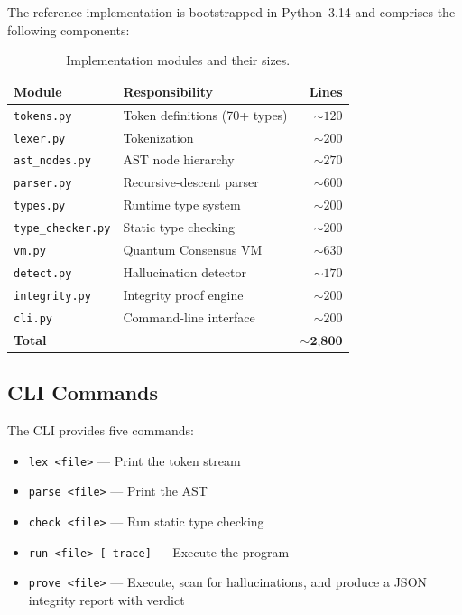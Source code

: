 \documentclass[11pt,a4paper]{article}
\begin{document}
The reference implementation is bootstrapped in Python~3.14 and comprises
the following components:

\begin{table}[H]
\centering
\caption{Implementation modules and their sizes.}
\label{tab:modules}
\begin{tabular}{@{}llr@{}}
\toprule
\textbf{Module} & \textbf{Responsibility} & \textbf{Lines} \\
\midrule
\texttt{tokens.py}       & Token definitions (70+ types)           & ${\sim}120$ \\
\texttt{lexer.py}        & Tokenization                            & ${\sim}200$ \\
\texttt{ast\_nodes.py}   & AST node hierarchy                      & ${\sim}270$ \\
\texttt{parser.py}       & Recursive-descent parser                & ${\sim}600$ \\
\texttt{types.py}        & Runtime type system                     & ${\sim}200$ \\
\texttt{type\_checker.py}& Static type checking                    & ${\sim}200$ \\
\texttt{vm.py}           & Quantum Consensus VM                    & ${\sim}630$ \\
\texttt{detect.py}       & Hallucination detector                  & ${\sim}170$ \\
\texttt{integrity.py}    & Integrity proof engine                  & ${\sim}200$ \\
\texttt{cli.py}          & Command-line interface                  & ${\sim}200$ \\
\midrule
\textbf{Total}           &                                         & ${\sim}\textbf{2{,}800}$ \\
\bottomrule
\end{tabular}
\end{table}

\subsection{CLI Commands}

The CLI provides five commands:
\begin{itemize}[leftmargin=2em]
  \item \texttt{lex <file>} --- Print the token stream
  \item \texttt{parse <file>} --- Print the AST
  \item \texttt{check <file>} --- Run static type checking
  \item \texttt{run <file> [--trace]} --- Execute the program
  \item \texttt{prove <file>} --- Execute, scan for hallucinations, and
    produce a JSON integrity report with verdict
\end{itemize}
\end{document}
